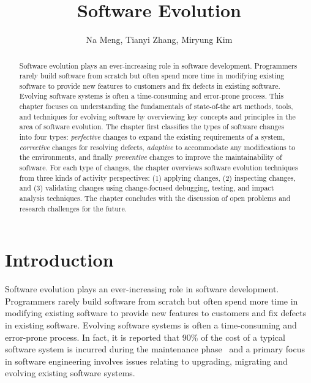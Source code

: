 \documentclass[runningheads,a4paper]{llncs}
\begin{document}
\mainmatter  %

\title{Software Evolution} 


%
%
\author{Na Meng, Tianyi Zhang, Miryung Kim} 



\maketitle


\begin{abstract}
	Software evolution plays an ever-increasing role in software development. Programmers rarely build software from scratch but often spend more time in modifying existing software to provide new features to customers and fix defects in existing software. Evolving software systems is often a time-consuming and error-prone process. This chapter focuses on understanding the fundamentals of state-of-the art methods, tools, and techniques for evolving software by overviewing key concepts and principles in the area of software evolution. 
	The chapter first classifies the types of software changes into four types: {\em perfective} changes to expand the existing requirements of a system, {\em corrective} changes for resolving defects, {\em adaptive} to accommodate any modifications to the environments, and finally {\em preventive} changes to improve the maintainability of software. For each type of changes, the chapter overviews software evolution techniques from three kinds of activity perspectives: (1) applying changes, (2) inspecting changes, and (3) validating changes using change-focused debugging, testing, and impact analysis techniques. The chapter concludes with the discussion of open problems and research challenges for the future. 
\end{abstract}

\section{Introduction}
Software evolution plays an ever-increasing role in software development. Programmers rarely build software from scratch but often spend more time in modifying existing software to provide new features to customers and fix defects in existing software.  Evolving software systems is often a time-consuming and error-prone process. In fact, it is reported that 90\% of the cost of a typical software system is incurred during the maintenance phase~\cite{Madhavji2006:evolution} and a primary focus in software engineering involves issues relating to upgrading, migrating and evolving existing software systems. 
\end{document}
